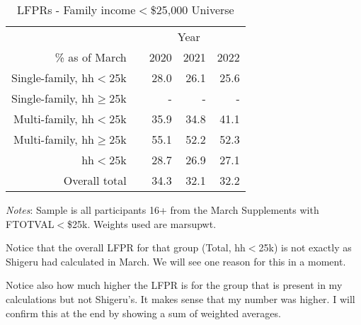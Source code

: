\documentclass{article}
\newcommand{\mct}[1]{\multicolumn{1}{c}{#1}}
\newcommand{\mc}[3]{\multicolumn{#1}{#2}{#3}}
\begin{document}
	
		\begin{table}[H]
		\centering
		\caption{LFPRs - Family income$<$\$25,000 Universe}
		\begin{tabularx}{0.8\textwidth}{@{\extracolsep{\fill}}r r r r r }
			\toprule 
			& \mc{4}{c}{Year}  \\ \cmidrule(lr){2-5}
			\% as of March 	& 		&	\mct{2020}	&	\mct{2021}	&	\mct{2022}	\\ \midrule
			Single-family, hh$<$25k \hspace{0.1cm} 		&	&	28.0	&	26.1	&	25.6	\\	
			Single-family, hh$\ge$25k \hspace{0.1cm} 		&	&	-	&	-	&	-	\\	
			
			Multi-family, hh$<$25k \hspace{0.1cm}  	&	&	35.9	&	34.8	&	41.1	\\
			Multi-family, hh$\ge$25k \hspace{0.1cm}  	&	&	55.1	&	52.2	&	52.3	\\
			\midrule
			hh$<$25k \hspace{0.1cm}  	&	&	28.7	& 	26.9	&	27.1		\\
			Overall total \hspace{0.1cm}  	&	&	34.3	&	32.1	&	32.2	\\
			\bottomrule
		\end{tabularx}
		\vspace{1mm}
		\vspace{1mm}
		\begin{minipage}[t]{\textwidth}
			\footnotesize{\emph{Notes}: Sample is all participants 16+ from the March Supplements with FTOTVAL$<$\$25k. Weights used are marsupwt.}
		\end{minipage}
	\end{table}
	
	
	Notice that the overall LFPR for that group (Total, hh$<$25k) is not exactly as Shigeru had calculated in March. We will see one reason for this in a moment. 
	
	Notice also how much higher the LFPR is for the group that is present in my calculations but not Shigeru's. It makes sense that my number was higher. I will confirm this at the end by showing a sum of weighted averages.
	
\end{document}
